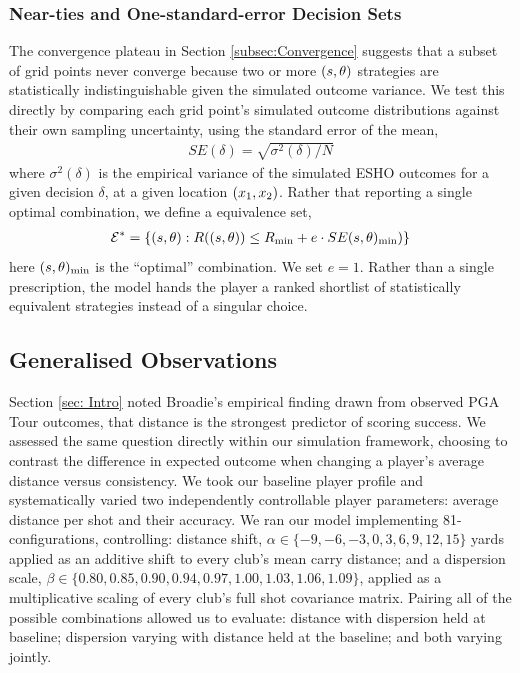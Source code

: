 \documentclass[11pt, letterpaper]{article}
\begin{document}
\subsubsection{Near-ties and One-standard-error Decision Sets}
\label{subsec:Options}

The convergence plateau in Section \ref{subsec:Convergence} suggests that a subset of grid points never converge because two or more $(s, \theta)$ strategies are statistically indistinguishable given the simulated outcome variance. We test this directly by comparing each grid point's simulated outcome distributions against their own sampling uncertainty, using the standard error of the mean,
\begin{align}
    SE(\delta) = \sqrt{\sigma^2(\delta)/N}
\end{align}
where $\sigma^2(\delta)$ is the empirical variance of the simulated ESHO outcomes for a given decision $\delta$, at a given location $(x_1, x_2)$. Rather that reporting a single optimal combination, we define a equivalence set,
\begin{align}
    \mathcal{E}^* = \left\{ (s, \theta) : R((s, \theta)) \leq R_{\min} + e \cdot SE(s, \theta)_ {\min}) \right\}
\end{align}
here $(s, \theta)_{\min}$ is the ``optimal'' combination. We set $e = 1$.  Rather than a single prescription, the model hands the player a ranked shortlist of statistically equivalent strategies instead of a singular choice. 



\subsection{Generalised Observations}
\label{subsec: genObs}
Section \ref{sec: Intro} noted Broadie's empirical finding drawn from observed PGA Tour outcomes, that distance is the strongest predictor of scoring success. We assessed the same question directly within our simulation framework, choosing to contrast the difference in expected outcome when changing a player's average distance versus consistency. We took our baseline player profile and systematically varied two independently controllable player parameters: average distance per shot and their accuracy. We ran our model implementing 81-configurations, controlling: distance shift, $\alpha \in \{-9, -6, -3, 0, 3, 6, 9, 12, 15\}$ yards applied as an additive shift to every club's mean carry distance; and a dispersion scale, $\beta \in \{0.80, 0.85, 0.90, 0.94, 0.97, 1.00, 1.03, 1.06, 1.09\}$, applied as a multiplicative scaling of every club's full shot covariance matrix. Pairing all of the possible combinations allowed us to evaluate: distance with dispersion held at baseline; dispersion varying with distance held at the baseline; and both varying jointly. 
\end{document}
